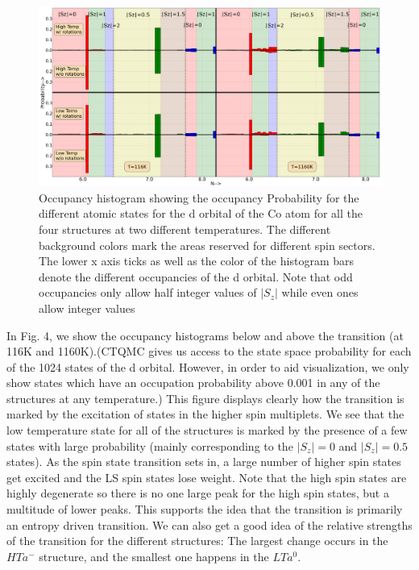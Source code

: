 \documentclass[10pt]{ruthesis}
\begin{document}
{\begin{figure}
\includegraphics[width=\columnwidth]{./plots_final/output/hist_final.png}
\caption{Occupancy histogram showing the occupancy Probability for the different atomic states for the d orbital of the Co atom for all the four structures at two different temperatures. The different background colors mark the areas reserved for different spin sectors.  The lower x axis ticks as well as the color of the histogram bars denote the different occupancies of the d orbital. Note that odd occupancies only allow half integer values of $|S_z|$ while even ones allow integer values}
\end{figure}


In Fig. 4, we show the occupancy histograms below and above the transition (at 116K and 1160K).(CTQMC gives us access to the state space probability for each of the 1024 states of the d orbital. However, in order to aid visualization, we only show states which have an occupation probability above 0.001 in any of the structures at any temperature.) This figure displays clearly how the transition is marked by the excitation of states in the higher spin multiplets. We see that the low temperature state for all of the structures is marked by the presence of a few states with large probability (mainly corresponding to the $|S_z|=0$ and $|S_z|=0.5$ states). As the spin state transition sets in, a large number of higher spin states get excited and the LS spin states lose weight. Note that the high spin states are highly degenerate so there is no one large peak for the high spin states, but a multitude of lower peaks. This supports the idea that the transition is primarily an entropy driven transition. We can also get a good idea of the relative strengths of the transition for the different structures: The largest change occurs in the $HTa^-$ structure, and the smallest one happens in the $LTa^0$. 

}
\end{document}
